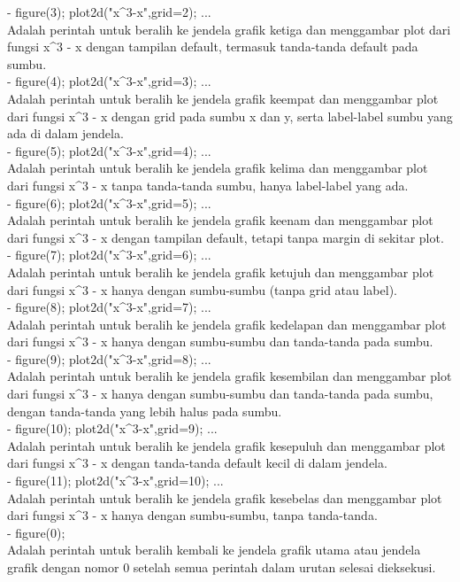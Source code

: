\documentclass[a4paper,10pt]{article}
\begin{document}
\begin{eulernotebook}
\begin{eulercomment}
\begin{eulercomment}
\begin{eulercomment}
- figure(3); plot2d("x\textasciicircum{}3-x",grid=2); ...\\
Adalah perintah untuk beralih ke jendela grafik ketiga dan menggambar
plot dari fungsi x\textasciicircum{}3 - x dengan tampilan default, termasuk tanda-tanda
default pada sumbu.\\
- figure(4); plot2d("x\textasciicircum{}3-x",grid=3); ...\\
Adalah perintah untuk beralih ke jendela grafik keempat dan menggambar
plot dari fungsi x\textasciicircum{}3 - x dengan grid pada sumbu x dan y, serta
label-label sumbu yang ada di dalam jendela.\\
- figure(5); plot2d("x\textasciicircum{}3-x",grid=4); ...\\
Adalah perintah untuk beralih ke jendela grafik kelima dan menggambar
plot dari fungsi x\textasciicircum{}3 - x tanpa tanda-tanda sumbu, hanya label-label
yang ada.\\
- figure(6); plot2d("x\textasciicircum{}3-x",grid=5); ...\\
Adalah perintah untuk beralih ke jendela grafik keenam dan menggambar
plot dari fungsi x\textasciicircum{}3 - x dengan tampilan default, tetapi tanpa margin
di sekitar plot.\\
- figure(7); plot2d("x\textasciicircum{}3-x",grid=6); ...\\
Adalah perintah untuk beralih ke jendela grafik ketujuh dan menggambar
plot dari fungsi x\textasciicircum{}3 - x hanya dengan sumbu-sumbu (tanpa grid atau
label).\\
- figure(8); plot2d("x\textasciicircum{}3-x",grid=7); ...\\
Adalah perintah untuk beralih ke jendela grafik kedelapan dan
menggambar plot dari fungsi x\textasciicircum{}3 - x hanya dengan sumbu-sumbu dan
tanda-tanda pada sumbu.\\
- figure(9); plot2d("x\textasciicircum{}3-x",grid=8); ...\\
Adalah perintah untuk beralih ke jendela grafik kesembilan dan
menggambar plot dari fungsi x\textasciicircum{}3 - x hanya dengan sumbu-sumbu dan
tanda-tanda pada sumbu, dengan tanda-tanda yang lebih halus pada
sumbu.\\
- figure(10); plot2d("x\textasciicircum{}3-x",grid=9); ...\\
Adalah perintah untuk beralih ke jendela grafik kesepuluh dan
menggambar plot dari fungsi x\textasciicircum{}3 - x dengan tanda-tanda default kecil
di dalam jendela.\\
- figure(11); plot2d("x\textasciicircum{}3-x",grid=10); ...\\
Adalah perintah untuk beralih ke jendela grafik kesebelas dan
menggambar plot dari fungsi x\textasciicircum{}3 - x hanya dengan sumbu-sumbu, tanpa
tanda-tanda.\\
- figure(0);\\
Adalah perintah untuk beralih kembali ke jendela grafik utama atau
jendela grafik dengan nomor 0 setelah semua perintah dalam urutan
selesai dieksekusi.


\end{eulercomment}
\end{eulercomment}
\end{eulercomment}
\end{eulernotebook}
\end{document}
